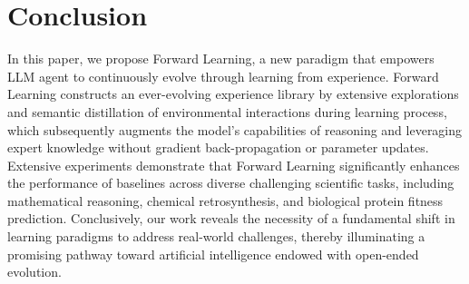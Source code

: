 \documentclass{article}
\newcommand{\method}{Forward Learning}
\begin{document}
\section{Conclusion}
In this paper, we propose \method{}, a new paradigm that empowers LLM agent to continuously evolve through learning from experience.
\method{} constructs an ever-evolving experience library by extensive explorations and semantic distillation of environmental interactions during learning process, which subsequently augments the model's capabilities of reasoning and leveraging expert knowledge without gradient back-propagation or parameter updates.
Extensive experiments demonstrate that \method{} significantly enhances the performance of baselines across diverse challenging scientific tasks, including mathematical reasoning, chemical retrosynthesis, and biological protein fitness prediction.
Conclusively, our work reveals the necessity of a fundamental shift in learning paradigms to address real-world challenges, thereby illuminating a promising pathway toward artificial intelligence endowed with open-ended evolution.







%




% 

\appendix
% 

% 
\end{document}
